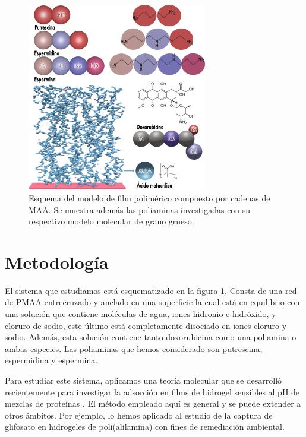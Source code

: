\begin{figure}[!htb]
	\centering
	\includegraphics[width=0.7\textwidth]{Figures/graph-film/poliamines_model.pdf}
	\caption{Esquema del modelo  de  film polim\'erico compuesto por cadenas de MAA. Se muestra adem\'as las poliaminas investigadas  con su respectivo modelo molecular de grano grueso.}
	\label{fig:film:model_poliamines}
\end{figure}





\section{Metodolog\'ia}


El sistema que estudiamos est\'a esquematizado en la figura \ref{fig:film:model_poliamines}.
Consta de una  red de PMAA entrecruzado y anclado en una superficie  la cual est\'a en equilibrio con una soluci\'on que contiene mol\'eculas de agua, iones hidronio e hidr\'oxido, y cloruro de sodio, este \'ultimo est\'a completamente disociado en iones cloruro y sodio.
Adem\'as, esta soluci\'on contiene tanto doxorubicina como una poliamina o ambas especies.
Las poliaminas que hemos considerado son putrescina, espermidina y espermina.

Para estudiar este sistema, aplicamos una teor\'ia molecular que se desarroll\'o recientemente para investigar la adsorci\'on en films de hidrogel sensibles al pH de mezclas de prote\'inas \cite{hagemann2018use, longo2019protonation}.
El m\'etodo empleado aqu\'i es general y se puede extender a otros \'ambitos. Por ejemplo, lo hemos aplicado al estudio de la captura de glifosato en hidrogeles de poli(alilamina) \cite{perez2018using} con fines de remediaci\'on ambiental.


